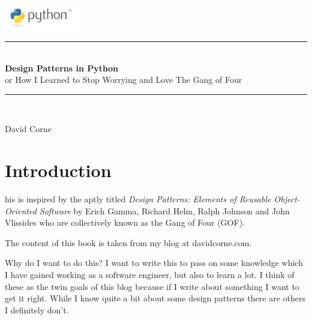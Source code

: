 \documentclass[12pt, oneside]{book} %
\newcommand{\HRule}{\rule{\linewidth}{0.5mm}} %
\begin{document}
\thispagestyle{empty}
\begin{center}
  \includegraphics[width=0.25\textwidth]{Python_Logo.png}\\[1cm]
\end{center} 
\HRule \\[0.4cm]
       {\Huge \bfseries \color{RoyalBlue}Design Patterns in Python} \\[0.4cm]
       {\huge or How I Learned to Stop Worrying and Love The Gang of Four} \\[0.4cm]
\HRule \\[1.5cm]

\begin{minipage}{0.4\textwidth}
  \begin{flushleft}
    \Large David Corne
  \end{flushleft}
\end{minipage}

\vfill

\frontmatter

\mainmatter

\chapter{Introduction}
his is inspired by the aptly titled \emph{Design Patterns: Elements of Reusable Object-Oriented Software} by Erich Gamma, Richard Helm, Ralph Johnson and John Vlissides who are collectively known as the Gang of Four (GOF).

The content of this book is taken from my blog at davidcorne.com.

Why do I want to do this? I want to write this to pass on some knowledge which I have gained working as a software engineer, but also to learn a lot. I think of these as the twin goals of this blog because if I write about something I want to get it right. While I know quite a bit about some design patterns there are others I definitely don't.
\end{document}
